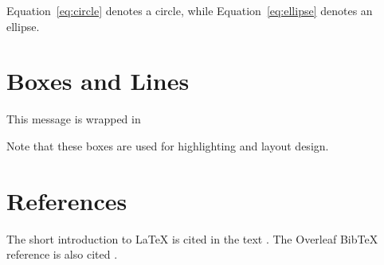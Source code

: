 \documentclass[12pt,a4paper]{article}
\begin{document}
Equation~\eqref{eq:circle} denotes a circle, while
Equation~\eqref{eq:ellipse} denotes an ellipse.

\section{Boxes and Lines}
\newsavebox{\savedmessage}

\usebox{\savedmessage}

\bigskip
\usebox{\savedmessage}

\bigskip
\usebox{\savedmessage}

\bigskip
This message is wrapped in


\medskip
Note that these boxes are used for highlighting and layout design.


\section*{References}
The short introduction to LaTeX is cited in the text
\citep{oetiker2021}. The Overleaf BibTeX reference is also cited
\citep{overleafBibTeX}.




\printindex
\end{document}
